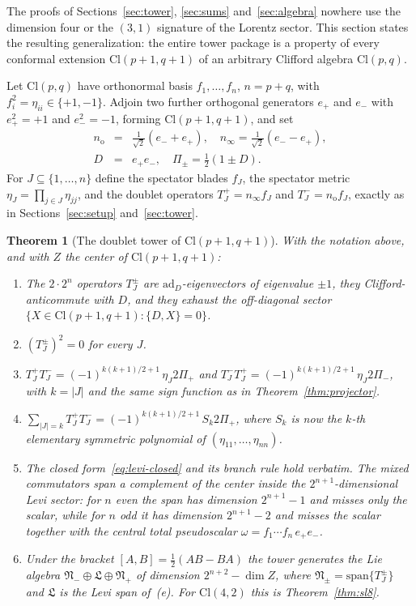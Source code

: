 \documentclass{birkjour}
\newtheorem{thm}{Theorem}[section]
\theoremstyle{definition}
\theoremstyle{remark}
\numberwithin{equation}{section}
\newcommand{\Cl}{\mathrm{Cl}}
\newcommand{\fkN}{\mathfrak{N}}
\newcommand{\fkL}{\mathfrak{L}}
\newcommand{\no}{n_{\mathrm{o}}}
\newcommand{\ninf}{n_{\infty}}
\newcommand{\ad}{\mathrm{ad}}
\newenvironment{revblock}{}{}
\begin{document}
\begin{revblock}
The proofs of Sections~\ref{sec:tower}, \ref{sec:sums}
and~\ref{sec:algebra} nowhere use the dimension four or the
$(3,1)$ signature of the Lorentz sector. This section states
the resulting generalization: the entire tower package is a
property of every conformal extension $\Cl(p+1,q+1)$ of an
arbitrary Clifford algebra $\Cl(p,q)$.

Let $\Cl(p,q)$ have orthonormal basis $f_1,\ldots,f_n$,
$n=p+q$, with $f_i^2=\eta_{ii}\in\{+1,-1\}$. Adjoin two
further orthogonal generators $e_+$ and $e_-$ with
$e_+^2=+1$ and $e_-^2=-1$, forming $\Cl(p+1,q+1)$, and set
\begin{eqnarray}\label{eq:general-setup}
\no&=&\tfrac{1}{\sqrt2}(e_-+e_+),\quad
\ninf=\tfrac{1}{\sqrt2}(e_--e_+), \nonumber \\
D&=&e_+e_-,\quad
\Pi_\pm=\tfrac12(1\pm D).
\end{eqnarray}
For $J\subseteq\{1,\ldots,n\}$ define the spectator blades
$f_J$, the spectator metric
$\eta_J=\prod_{j\in J}\eta_{jj}$, and the doublet operators
$T^+_J=\ninf f_J$ and $T^-_J=\no f_J$, exactly as in
Sections~\ref{sec:setup} and~\ref{sec:tower}.

\begin{thm}[The doublet tower of $\Cl(p+1,q+1)$]
\label{thm:general}
With the notation above, and with $Z$ the center of
$\Cl(p+1,q+1)$:
\begin{enumerate}[label=\textup{(\alph*)}]
\item The $2\cdot2^n$ operators $T^\pm_J$ are
$\ad_D$-eigenvectors of eigenvalue $\pm1$, they
Clifford-anticommute with $D$, and they exhaust the
off-diagonal sector
$\{X\in\Cl(p+1,q+1):\{D,X\}=0\}$.
\item $(T^\pm_J)^2=0$ for every $J$.
\item $T^+_J T^-_J=(-1)^{k(k+1)/2+1}\,\eta_J 2\Pi_+$ and
$T^-_J T^+_J=(-1)^{k(k+1)/2+1}\,\eta_J 2\Pi_-$, with
$k=|J|$ and the same sign function as in
Theorem~\ref{thm:projector}.
\item $\sum_{|J|=k}T^+_J T^-_J
=(-1)^{k(k+1)/2+1}\,S_k 2\Pi_+$, where $S_k$ is now the
$k$-th elementary symmetric polynomial of
$(\eta_{11},\ldots,\eta_{nn})$.
\item The closed form~\eqref{eq:levi-closed} and its branch
rule hold verbatim. The mixed commutators span a complement
of the center inside the $2^{n+1}$-dimensional Levi sector:
for $n$ even the span has dimension $2^{n+1}-1$ and misses
only the scalar, while for $n$ odd it has dimension
$2^{n+1}-2$ and misses the scalar together with the central
total pseudoscalar $\omega=f_1\cdots f_n\,e_+e_-$.
\item Under the bracket $[A,B]=\tfrac12(AB-BA)$ the tower
generates the Lie algebra
$\fkN_-\oplus\fkL\oplus\fkN_+$ of dimension
$2^{n+2}-\dim Z$, where $\fkN_\pm=\mathrm{span}\{T^\pm_J\}$
and $\fkL$ is the Levi span of~(e). For $\Cl(4,2)$ this is
Theorem~\ref{thm:sl8}.
\end{enumerate}
\end{thm}


\end{revblock}
\end{document}
